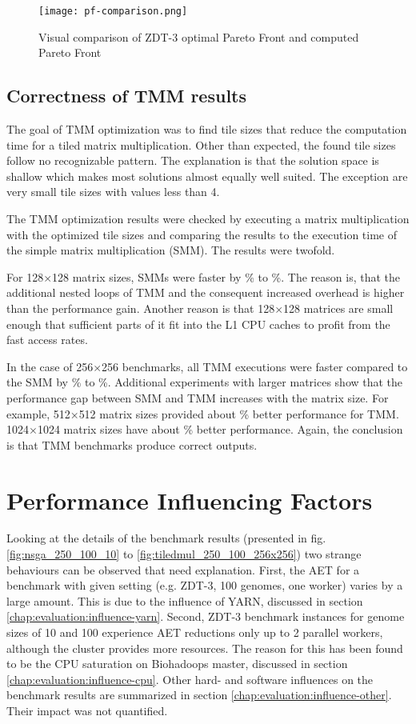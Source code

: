 \begin{figure}
  \centering
  \texttt{[image: pf-comparison.png]}
  \caption[Comparison of optimal and computed PF for ZDT-3]{Visual comparison of ZDT-3 optimal Pareto Front and computed Pareto Front}
  \label{fig:pf-comparison}
\end{figure}

\subsection{Correctness of TMM results}
The goal of TMM optimization was to find tile sizes that reduce the computation time for a tiled matrix multiplication. Other than expected, the found tile sizes follow no recognizable pattern. The explanation is that the solution space is shallow which makes most solutions almost equally well suited. The exception are very small tile sizes with values less than 4.

The TMM optimization results were checked by executing a matrix multiplication with the optimized tile sizes and comparing the results to the execution time of the simple matrix multiplication (SMM). The results were twofold.

For 128$\times$128 matrix sizes, SMMs were faster by \unit[10]{\%} to \unit[15]{\%}. The reason is, that the additional nested loops of TMM and the consequent increased overhead is higher than the performance gain. Another reason is that 128$\times$128 matrices are small enough that sufficient parts of it fit into the L1 CPU caches to profit from the fast access rates.

In the case of 256$\times$256 benchmarks, all TMM executions were faster compared to the SMM by \unit[20]{\%} to \unit[30]{\%}. Additional experiments with larger matrices show that the performance gap between SMM and TMM increases with the matrix size. For example, 512$\times$512 matrix sizes provided about \unit[50]{\%} better performance for TMM. 1024$\times$1024 matrix sizes have about \unit[400]{\%} better performance. Again, the conclusion is that TMM benchmarks produce correct outputs.

\section{Performance Influencing Factors}
\label{chap:evaluation:influence}
Looking at the details of the benchmark results (presented in fig. \ref{fig:nsga_250_100_10} to \ref{fig:tiledmul_250_100_256x256}) two strange behaviours can be observed that need explanation. First, the AET for a benchmark with given setting (e.g. ZDT-3, 100 genomes, one worker) varies by a large amount. This is due to the influence of YARN, discussed in section \ref{chap:evaluation:influence-yarn}. Second, ZDT-3 benchmark instances for genome sizes of 10 and 100 experience AET reductions only up to 2 parallel workers, although the cluster provides more resources. The reason for this has been found to be the CPU saturation on Biohadoops master, discussed in section \ref{chap:evaluation:influence-cpu}. Other hard- and software influences on the benchmark results are summarized in section \ref{chap:evaluation:influence-other}. Their impact was not quantified.


